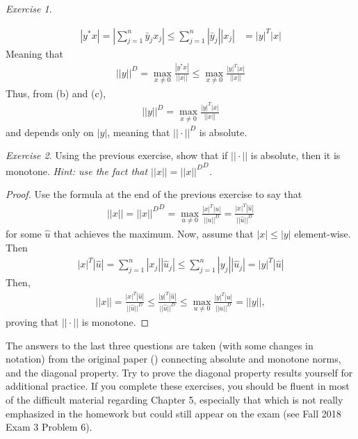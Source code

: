 \documentclass[11pt]{article}
\theoremstyle{plain}
\theoremstyle{definition}
\theoremstyle{remark}
\newtheorem{exc}{Exercise}[section]
\begin{document}
\begin{exc}
\begin{enumerate}
        \begin{align*}
            |y^* x| = \left|\sum_{j=1}^n \bar{y}_j x_j \right| \leq \sum_{j=1}^n |\bar{y}_j| |x_j| &= |y|^T |x|
        \end{align*}
        Meaning that
        \begin{align*}
            ||y||^D = \max_{x \neq 0} \frac{|y^* x|}{||x||} \leq \max_{x \neq 0} \frac{ |y|^T |x|}{||x||}
        \end{align*}
        Thus, from (b) and (c), 
        \begin{align*}
            ||y||^D = \max_{x \neq 0} \frac{ |y|^T |x|}{||x||}
        \end{align*}
        and depends only on $|y|$, meaning that $||\cdot||^D$ is absolute.
    \end{enumerate}
\end{exc}

\begin{exc}
    Using the previous exercise, show that if $||\cdot||$ is absolute, then it is monotone. {\it Hint: use the fact that $||x|| = {||x||^D}^D$.}
    \begin{proof}
        Use the formula at the end of the previous exercise to say that
        \begin{align*}
            ||x|| = {||x||^D}^D = \max_{u \neq 0} \frac{ |x|^T |u|}{||u||^D} = \frac{ |x|^T |\hat{u}|}{||\hat{u}||^D}
        \end{align*}
        for some $\hat{u}$ that achieves the maximum. Now, assume that $|x| \leq |y|$ element-wise. Then
        \begin{align*}
            |x|^T |\hat{u}| = \sum_{j=1}^n |x_j| |\hat{u}_j| \leq \sum_{j=1}^n |y_j| |\hat{u}_j| = |y|^T |\hat{u}|
        \end{align*}
        Then,
        \begin{align*}
            ||x|| = \frac{ |x|^T |\hat{u}|}{||\hat{u}||^D} \leq \frac{ |y|^T |\hat{u}|}{||\hat{u}||^D} \leq \max_{u \neq 0} \frac{ |y|^T |u|}{||u||^D} = ||y||,
        \end{align*}
        proving that $||\cdot||$ is monotone.
    \end{proof}
\end{exc}

The answers to the last three questions are taken (with some changes in notation) from the original paper (\citet{monotone}) connecting absolute and monotone norms, and the diagonal property. Try to prove the diagonal property results yourself for additional practice. If you complete these exercises, you should be fluent in most of the difficult material regarding Chapter 5, especially that which is not really emphasized in the homework but could still appear on the exam (see Fall 2018 Exam 3 Problem 6).
\end{document}
